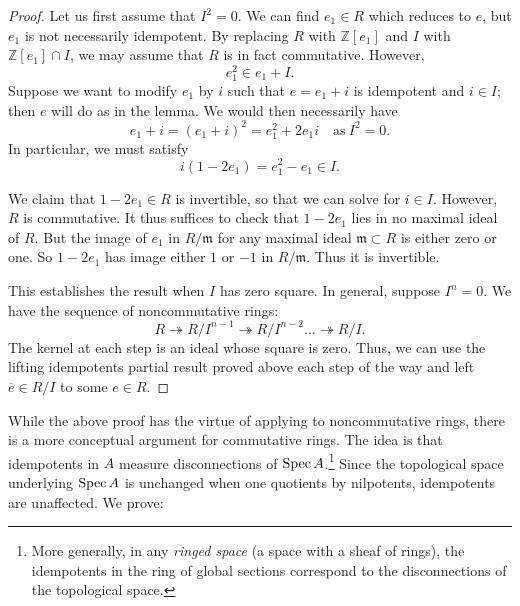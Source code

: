 \begin{proof} Let us first assume that $I^2 = 0$. 
We can find $e_1 \in R$ which reduces to $e$, but $e_1$ is not necessarily
idempotent.
By replacing $R$ with $\mathbb{Z}[e_1]$ and $I$ with $\mathbb{Z}[e_1] \cap I$,
we may assume that $R$ is in fact commutative. 	
However, 
\[ e_1^2 \in e_1 + I.  \]
Suppose we want to modify $e_1$ by $i$ such that $e = e_1 + i$ is
idempotent and $i \in I$; then $e$ will do as in the lemma. We would then
necessarily have
\[ e_1 + i = (e_1 + i)^2 = e_1^2 + 2e_1 i\quad \mathrm{as} \ I^2 =0 .  \]
In particular, we must satisfy
\[ i(1-2e_1) = e_1^2 - e_1  \in I. \]

We claim that $1 - 2e_1 \in R$ is invertible, so that we can solve for $i \in I$. 
However, $R$ is commutative. It thus suffices to check that $1 - 2e_1$ lies in
no maximal ideal of $R$. But the image of $e_1$ in $R/\mathfrak{m}$ for any
maximal ideal $\mathfrak{m} \subset R$ is either zero or one. So $1 - 2e_1$ has
image either $1$ or $-1$ in $R/\mathfrak{m}$. Thus it is invertible. 

This establishes the result when $I$ has zero square. In general, suppose $I^n
= 0$. We have the sequence of noncommutative rings:
\[ R \twoheadrightarrow R/I^{n-1} \twoheadrightarrow R/I^{n-2} \dots
\twoheadrightarrow R/I. \]
The kernel at each step is an ideal whose square is zero. Thus, we can use the
lifting idempotents partial result proved above each step of the way and left
$\overline{e}  \in R/I$ to some $e \in R$. 
\end{proof} 


While the above proof has the virtue of applying to noncommutative rings,
there is a more conceptual argument for commutative rings. The idea is that
idempotents in $A$ measure disconnections of $\operatorname{Spec} A$.\footnote{More
generally, in any \emph{ringed space} (a space with a sheaf of rings), the
idempotents in the ring of global sections correspond to the disconnections of
the topological space.} Since the topological space underlying $\operatorname{Spec} A$ is
unchanged when one quotients by nilpotents, idempotents are unaffected.
We prove:

